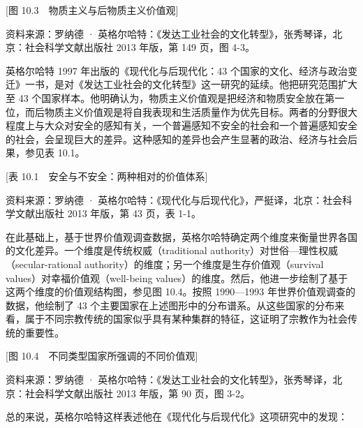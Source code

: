[图 10.3　物质主义与后物质主义价值观]

资料来源：罗纳德 · 英格尔哈特：《发达工业社会的文化转型》，张秀琴译，北京：社会科学文献出版社 2013 年版，第 149 页，图 4-3。

英格尔哈特 1997 年出版的《现代化与后现代化：43 个国家的文化、经济与政治变迁》一书，是对《发达工业社会的文化转型》这一研究的延续。他把研究范围扩大至 43 个国家样本。他明确认为，物质主义价值观是把经济和物质安全放在第一位，而后物质主义价值观是将自我表现和生活质量作为优先目标。两者的分野很大程度上与大众对安全的感知有关，一个普遍感知不安全的社会和一个普遍感知安全的社会，会呈现巨大的差异。这种感知的差异也会产生显著的政治、经济与社会后果，参见表 10.1。

[表 10.1　安全与不安全：两种相对的价值体系]

资料来源：罗纳德 · 英格尔哈特：《现代化与后现代化》，严挺译，北京：社会科学文献出版社 2013 年版，第 43 页，表 1-1。

在此基础上，基于世界价值观调查数据，英格尔哈特确定两个维度来衡量世界各国的文化差异。一个维度是传统权威（traditional authority）对世俗—理性权威（secular-rational authority）的维度；另一个维度是生存价值观（survival values）对幸福价值观（well-being values）的维度。然后，他进一步绘制了基于这两个维度的价值观结构图，参见图 10.4。按照 1990—1993 年世界价值观调查的数据，他绘制了 43 个主要国家在上述图形中的分布谱系。从这些国家的分布来看，属于不同宗教传统的国家似乎具有某种集群的特征，这证明了宗教作为社会传统的重要性。

[图 10.4　不同类型国家所强调的不同价值观]

资料来源：罗纳德 · 英格尔哈特：《发达工业社会的文化转型》，张秀琴译，北京：社会科学文献出版社 2013 年版，第 90 页，图 3-2。

总的来说，英格尔哈特这样表述他在《现代化与后现代化》这项研究中的发现：


